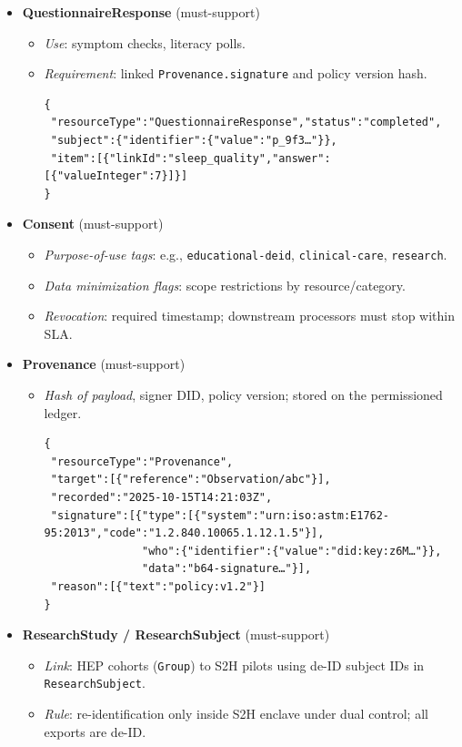 \documentclass[11pt]{article}
\theoremstyle{plain}
\begin{document}
\begin{itemize}
  \item \textbf{QuestionnaireResponse} (must-support)
    \begin{itemize}
      \item \emph{Use}: symptom checks, literacy polls.
      \item \emph{Requirement}: linked \texttt{Provenance.signature} and policy version hash.
\begin{verbatim}
{
 "resourceType":"QuestionnaireResponse","status":"completed",
 "subject":{"identifier":{"value":"p_9f3…"}},
 "item":[{"linkId":"sleep_quality","answer":[{"valueInteger":7}]}]
}
\end{verbatim}
    \end{itemize}

  \item \textbf{Consent} (must-support)
    \begin{itemize}
      \item \emph{Purpose-of-use tags}: e.g., \texttt{educational-deid}, \texttt{clinical-care}, \texttt{research}.
      \item \emph{Data minimization flags}: scope restrictions by resource/category.
      \item \emph{Revocation}: required timestamp; downstream processors must stop within SLA.
    \end{itemize}

  \item \textbf{Provenance} (must-support)
    \begin{itemize}
      \item \emph{Hash of payload}, signer DID, policy version; stored on the permissioned ledger.
\begin{verbatim}
{
 "resourceType":"Provenance",
 "target":[{"reference":"Observation/abc"}],
 "recorded":"2025-10-15T14:21:03Z",
 "signature":[{"type":[{"system":"urn:iso:astm:E1762-95:2013","code":"1.2.840.10065.1.12.1.5"}],
               "who":{"identifier":{"value":"did:key:z6M…"}},
               "data":"b64-signature…"}],
 "reason":[{"text":"policy:v1.2"}]
}
\end{verbatim}
    \end{itemize}

  \item \textbf{ResearchStudy / ResearchSubject} (must-support)
    \begin{itemize}
      \item \emph{Link}: HEP cohorts (\texttt{Group}) to S2H pilots using de-ID subject IDs in \texttt{ResearchSubject}.
      \item \emph{Rule}: re-identification only inside S2H enclave under dual control; all exports are de-ID.
    \end{itemize}
\end{itemize}
\end{document}
